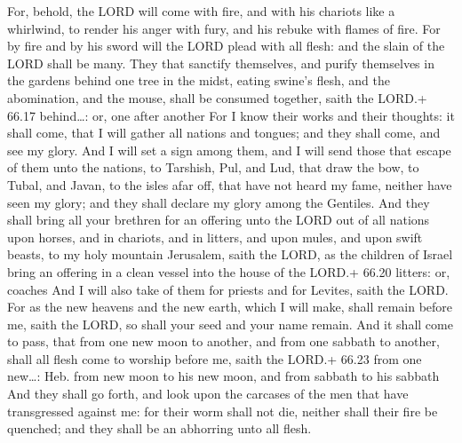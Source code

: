  For, behold, the LORD will come with fire, and with his
chariots like a whirlwind, to render his anger with fury, and his rebuke
with flames of fire.  For by fire and by his sword will the
LORD plead with all flesh: and the slain of the LORD shall be many.
 They that sanctify themselves, and purify themselves in
the gardens behind one tree in the midst, eating swine's flesh, and the
abomination, and the mouse, shall be consumed together, saith the LORD.+
66.17 behind\ldots: or, one after another  For I know their
works and their thoughts: it shall come, that I will gather all nations
and tongues; and they shall come, and see my glory.  And I
will set a sign among them, and I will send those that escape of them
unto the nations, to Tarshish, Pul, and Lud, that draw the bow, to
Tubal, and Javan, to the isles afar off, that have not heard my fame,
neither have seen my glory; and they shall declare my glory among the
Gentiles.  And they shall bring all your brethren for an
offering unto the LORD out of all nations upon horses, and in chariots,
and in litters, and upon mules, and upon swift beasts, to my holy
mountain Jerusalem, saith the LORD, as the children of Israel bring an
offering in a clean vessel into the house of the LORD.+ 66.20 litters:
or, coaches  And I will also take of them for priests and
for Levites, saith the LORD.  For as the new heavens and
the new earth, which I will make, shall remain before me, saith the
LORD, so shall your seed and your name remain.  And it
shall come to pass, that from one new moon to another, and from one
sabbath to another, shall all flesh come to worship before me, saith the
LORD.+ 66.23 from one new\ldots: Heb. from new moon to his new moon, and
from sabbath to his sabbath  And they shall go forth, and
look upon the carcases of the men that have transgressed against me: for
their worm shall not die, neither shall their fire be quenched; and they
shall be an abhorring unto all flesh.
